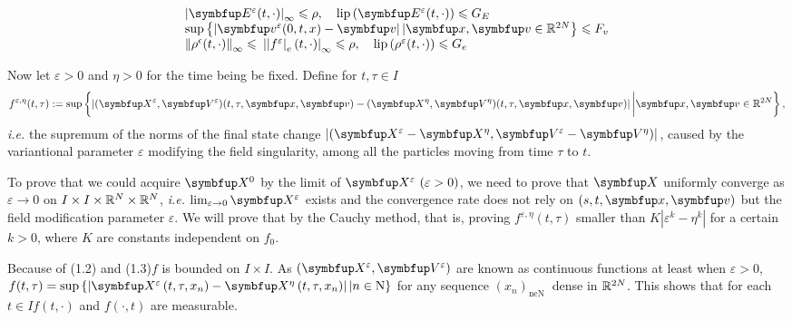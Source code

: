 \begin{lemma}
\[
\begin{array}{l}
\left|\vE^{\varepsilon}(t, \cdot)\right|_{\infty} \leqslant \rho, \quad \operatorname{lip}\left(\vE^{\varepsilon}(t, \cdot)\right) \leqslant G_{E} \\
\sup \left\{\left|\vv^{\varepsilon}(0, t, x)-\vv\right| |\vx, \vv\in \bbR^{2 N}\right\} \leqslant F_{v} \\
\left\|\rho^{\epsilon}(t, \cdot)\right\|_{\infty} \leqslant\left.\left.|| f^{\varepsilon}\right|_{e}(t, \cdot)\right|_{\infty} \leqslant \rho, \quad \operatorname{lip}\left(\rho^{\varepsilon}(t, \cdot)\right) \leqslant G_{e}
\end{array}
\]

\begin{definition}
Now let $\varepsilon>0$ and $\eta>0$ for the time being be fixed. Define for $t, \tau \in I$
\[
f^{\varepsilon, \eta}(t, \tau):=\sup \left\{\left|(\vect{X}^{\varepsilon},\vect{V}^{\varepsilon})(t, \tau, \vx, \vv)-(\vect{X}^{\eta},\vect{V}^{\eta})(t, \tau, \vx, \vv)\right| \bigg|\vx, \vv\in \bbR^{2 N}\right\},
\]
\textit{i.e.} the supremum of the norms of the final state change $|(\vect{X}^\varepsilon - \vect{X}^\eta, \vect{V}^\varepsilon-\vect{V}^\eta)|$, caused by the variantional parameter $\varepsilon$ modifying the field singularity, among all the particles moving from time $\tau$ to $t$.
\end{definition} 

To prove that we could acquire $\vect{X}^0$ by the limit of $\vect{X}^\varepsilon ~(\varepsilon>0)$, we need to prove that $\vect{X}$ uniformly converge as $\varepsilon\rightarrow 0$ on $I\times I \times {\mathbb{R}}^N \times {\mathbb{R}}^N$, \textit{i.e.} $\lim_{\varepsilon\rightarrow 0} \vect{X}^\varepsilon$ exists and the convergence rate does not rely on $(s,t,\vx,\vv)$ but the field modification parameter $\varepsilon$. We will prove that by the Cauchy method, that is, proving $f^{\varepsilon, \eta}(t, \tau)$ smaller than $K |\varepsilon^{k} -\eta^k|$ for a certain $k>0$, where $K$ are constants independent on $f_0$.


Because of (1.2) and (1.3)$f$ is bounded on $I \times I .$ As $(\vect{X}^{\varepsilon}, \vect{V}^{\varepsilon})$ are known as continuous functions at least when $\varepsilon>0$, $f(t, \tau)=\sup \left\{\left|\vect{X}^{\varepsilon}\left(t, \tau, x_{n}\right)-\vect{X}^{\eta}\left(t, \tau, x_{n}\right)\right| | n \in \mathrm{N}\right\}$ for any sequence
$\left(x_{n}\right)_{\text {neN }}$ dense in ${\mathbb{R}}^{2 N}$. This shows that for each $t \in I f(t, \cdot)$ and $f(\cdot, t)$ are measurable. 




\end{lemma}
